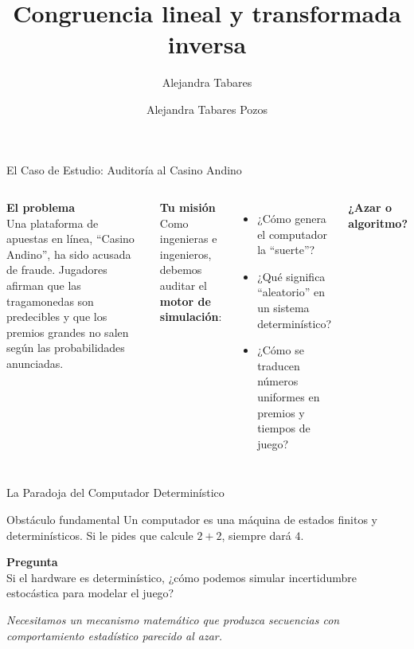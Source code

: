 \documentclass[aspectratio=1610, 9pt]{beamer}
\title[Congruencia lineal y transformada i…]{Congruencia lineal y transformada inversa}
\subtitle{Alejandra Tabares}
\author{Alejandra Tabares Pozos}
\institute{Universidad de los Andes \\
 Departamento de Ingeniería Industrial}
\date{}
\begin{document}
\begin{frame}
    \titlepage
\end{frame}

\begin{frame}{El Caso de Estudio: Auditoría al Casino Andino}
    \begin{columns}
        \textbf{El problema}\\
        Una plataforma de apuestas en línea, ``Casino Andino'', ha sido acusada de fraude.
        Jugadores afirman que las tragamonedas son predecibles y que los premios grandes
        no salen según las probabilidades anunciadas.

        \vspace{0.45cm}

        \textbf{Tu misión}\\
        Como ingenieras e ingenieros, debemos auditar el \textbf{motor de simulación}:
        \begin{itemize}
            \item ¿Cómo genera el computador la ``suerte''?
            \item ¿Qué significa ``aleatorio'' en un sistema determinístico?
            \item ¿Cómo se traducen números uniformes en premios y tiempos de juego?
        \end{itemize}

        \centering
        \textbf{¿Azar o algoritmo?}
    \end{columns}
\end{frame}

\begin{frame}{La Paradoja del Computador Determinístico}
    \begin{alertblock}{Obstáculo fundamental}
    Un computador es una máquina de estados finitos y determinísticos.
    Si le pides que calcule $2+2$, siempre dará $4$.
    \end{alertblock}

    \vspace{0.45cm}

    \textbf{Pregunta}\\
    Si el hardware es determinístico, ¿cómo podemos simular incertidumbre estocástica
    para modelar el juego?

    \vspace{0.25cm}
    \textit{Necesitamos un mecanismo matemático que produzca secuencias con comportamiento estadístico parecido al azar.}
\end{frame}
\end{document}
